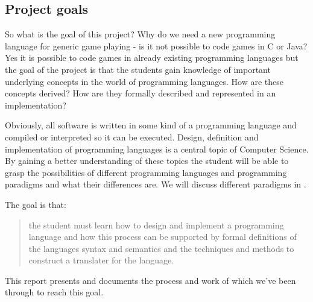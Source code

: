 \subsection{Project goals}
\label{sec:projectgoals}

So what is the goal of this project? Why do we need a new programming language for generic game playing - is it not possible to code games in C or Java? Yes it is possible to code games in already existing programming languages but the goal of the project is that the students gain knowledge of important underlying concepts in the world of programming languages. How are these concepts derived? How are they formally described and represented in an implementation? 

Obviously, all software is written in some kind of a programming language and compiled or interpreted so it can be executed. Design, definition and implementation of programming languages is a central topic of Computer Science. By gaining a better understanding of these topics the student will be able to grasp the possibilities of different programming languages and programming paradigms and what their differences are.\cite[p. 22]{dat-stud-ordning} We will discuss different paradigms in . 

The goal is that:

\begin{quote}
the student must learn how to design and implement a programming language and how this process can be supported by formal definitions of the languages syntax and semantics and the techniques and methods to construct a translater for the language.\cite[p. 22]{dat-stud-ordning}
\end{quote}

This report presents and documents the process and work of which we've been through to reach this goal.